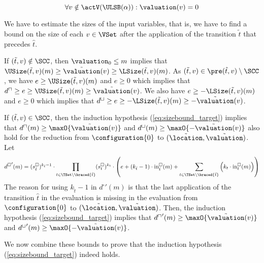 \begin{equation} \label{eq:nonactiveequalzero}
  \forall v \notin \actV(\ULSB(\alpha)): \valuation(v) = 0
\end{equation}

We have to estimate the sizes of the input variables,
that is, we have to find a bound on the size of each $v \in \VSet$ after the application of the transition $\tilde{t}$ that precedes $\hat{t}$.

If $(\tilde{t}, v) \notin \SCC$, then $\valuation_0 \leq m$ implies that $\USize(\tilde{t}, v)(m) \geq \tilde{\valuation}(v) \geq \LSize(\tilde{t}, v)(m)$.
As $(\tilde{t}, v) \in \pre(\hat{t}, v) \setminus \SCC$, we have $e \geq \USize(\tilde{t}, v)(m)$ and $e \geq 0$ which implies that $d^\sqcap \geq e \geq \USize(\tilde{t}, v)(m) \geq \tilde{\valuation}(v)$.
We also have $e \geq -\LSize(\tilde{t}, v)(m)$ and $e \geq 0$ which implies that $d^\sqcup \geq e \geq -\LSize(\tilde{t}, v)(m) \geq -\tilde{\valuation}(v)$.

If $(\tilde{t}, v) \in \SCC$, then the induction hypothesis (\ref{eq:sizebound_target}) implies that $d^\sqcap(m) \geq \maxO{\tilde{\valuation}(v)}$ and $d^\sqcup(m) \geq \maxO{-\tilde{\valuation}(v)}$ also hold for the reduction from $\configuration{0}$ to $(\tilde{\location}, \tilde{\valuation})$.
Let
\begin{equation} \label{eq:induction_consequence}
  {d^\square}'(m) = (s^\square_{\hat{t}})^{k_{\hat{t}} - 1} \cdot \prod_{t \in \TSet \setminus \braced{\hat{t}}} (s^\square_t)^{k_t} \cdot \left( e + \left( k_{\hat{t}} - 1 \right) \cdot \text{in}^\square_{\hat{t}}(m) + \sum_{t \in \TSet \setminus \braced{\hat{t}}} \left( k_t \cdot \text{in}^\square_t(m) \right) \right)
\end{equation}
The reason for using $k_{\hat{t}} - 1$ in ${d^\square}'(m)$ is that the last application of the transition $\hat{t}$ in the evaluation is missing in the evaluation from $\configuration{0}$ to $(\tilde{\location}, \tilde{\valuation})$.
Then, the induction hypothesis (\ref{eq:sizebound_target}) implies that ${d^\sqcap}'(m) \geq \maxO{\tilde{\valuation}(v)}$ and ${d^\sqcup}'(m) \geq \maxO{-\tilde{\valuation}(v)}$.

We now combine these bounds to prove that the induction hypothesis (\ref{eq:sizebound_target}) indeed holds.

